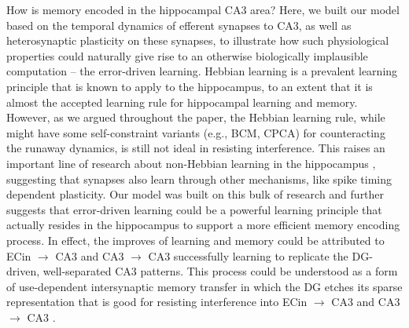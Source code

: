 \documentclass[11pt,twoside]{article}
\newif\myifpdf
\begin{document}
How is memory encoded in the hippocampal CA3 area?  Here, we built our model based on the temporal dynamics of efferent synapses to CA3, as well as heterosynaptic plasticity on these synapses, to illustrate how such physiological properties could naturally give rise to an otherwise biologically implausible computation -- the error-driven learning.  Hebbian learning is a prevalent learning principle that is known to apply to the hippocampus, to an extent that it is almost the accepted learning rule for hippocampal learning and memory.  However, as we argued throughout the paper, the Hebbian learning rule, while might have some self-constraint variants (e.g., BCM, CPCA) for counteracting the runaway dynamics, is still not ideal in resisting interference.  This raises an important line of research about non-Hebbian learning in the hippocampus \citep{RebolaCartaMulle17,Jackson20,PandaRoy17,ChistiakovaBannonBazhenovEtAl14}, suggesting that synapses also learn through other mechanisms, like spike timing dependent plasticity.  Our model was built on this bulk of research and further suggests that error-driven learning could be a powerful learning principle that actually resides in the hippocampus to support a more efficient memory encoding process.  In effect, the improves of learning and memory could be attributed to ECin $\rightarrow$ CA3 and CA3 $\rightarrow$ CA3 successfully learning to replicate the DG-driven, well-separated CA3 patterns.  This process could be understood as a form of use-dependent intersynaptic
memory transfer in which the DG etches its sparse representation that is good for resisting interference into ECin $\rightarrow$ CA3 and CA3 $\rightarrow$ CA3 \citep{TsukamotoYasuiYamadaEtAl03}.
\end{document}
